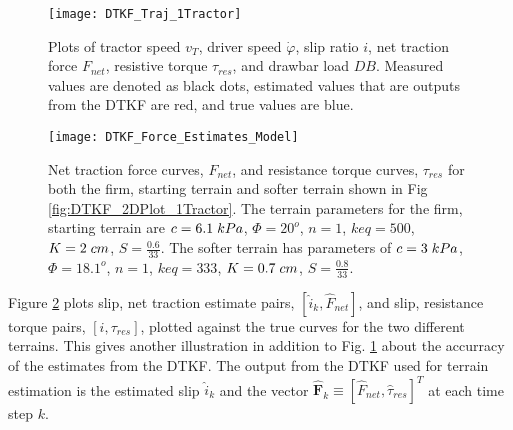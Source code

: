 \begin{figure}[htb]
    \centering
    \texttt{[image: DTKF\_Traj\_1Tractor]}
    \vspace{-40pt}
    \caption{Plots of tractor speed $v_T$, driver speed $\dot\varphi$, slip ratio $i$, net traction force $F_{net}$, resistive torque $\tau_{res}$, and drawbar load $DB$. Measured values are denoted as black dots, estimated values that are outputs from the DTKF are red, and true values are blue.}
    \label{fig:DTKF_Traj_1Tractor}
\end{figure}
\begin{figure}[htb]
    \centering
    \texttt{[image: DTKF\_Force\_Estimates\_Model]}
    \caption{Net traction force curves, $F_{net}$, and resistance torque curves, $\tau_{res}$ for both the firm, starting terrain and softer terrain shown in Fig \ref{fig:DTKF_2DPlot_1Tractor}. The terrain parameters for the firm, starting terrain are $c = 6.1\hspace{1mm}kPa$, $\Phi = 20^o$, $n = 1$, $keq = 500$, $K = 2\hspace{1mm}cm$, $S = \frac{0.6}{33}$. The softer terrain has parameters of $c = 3\hspace{1mm}kPa$, $\Phi = 18.1^o$, $n = 1$, $keq = 333$, $K = 0.7\hspace{1mm}cm$, $S = \frac{0.8}{33}$.}
    \label{fig:DTKF_Force_Estimates_Model}
\end{figure}
Figure \ref{fig:DTKF_Force_Estimates_Model} plots slip, net traction estimate pairs, $[\hat{i}_k,\hat{F}_{net}]$, and slip, resistance torque pairs, $[i,\tau_{res}]$, plotted against the true curves for the two different terrains. This gives another illustration in addition to Fig. \ref{fig:DTKF_Traj_1Tractor} about the accurracy of the estimates from the DTKF. The output from the DTKF used for terrain estimation is the estimated slip $\hat{i}_k$ and the vector $\hat{\mathbf{F}}_k \equiv [\hat{F}_{net},\hat{\tau}_{res}]^T$ at each time step $k$.